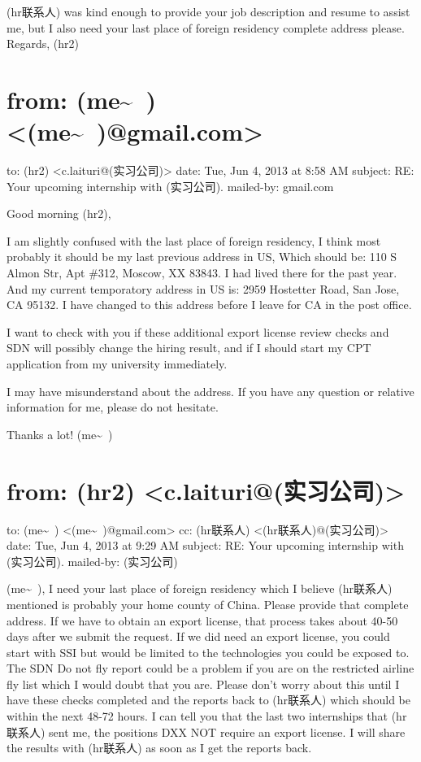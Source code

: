 \documentclass[12pt]{book}
\begin{document}
(hr联系人) was kind enough to provide your job description and resume to assist me, but I also need your last place of foreign residency complete address please.
Regards,
(hr2)


\section{from:         (me\textasciitilde{}~) <(me\textasciitilde{}~)@gmail.com>}
\label{sec-39-2}
to:         (hr2) <c.laituri@(实习公司)>
date:         Tue, Jun 4, 2013 at 8:58 AM
subject:         RE: Your upcoming internship with (实习公司).
mailed-by:         gmail.com

Good morning (hr2),

I am slightly confused with the last place of foreign residency, I think most probably it should be my last previous address in US, Which should be:  110 S Almon Str, Apt \#312, Moscow, XX 83843. I had lived there for the past year. And my current temporatory address in US is:  2959 Hostetter Road, San Jose, CA 95132. I have changed to this address before I leave for CA in the post office.

I want to check with you if these additional export license review checks and SDN will possibly change the hiring result, and if I should start my CPT application from my university immediately. 

I may have misunderstand about the address. If you have any question or relative information for me, please do not hesitate.

Thanks a lot!
(me\textasciitilde{}~)


\section{from:         (hr2) <c.laituri@(实习公司)>}
\label{sec-39-3}
to:         (me\textasciitilde{}~) <(me\textasciitilde{}~)@gmail.com>
cc:         (hr联系人) <(hr联系人)@(实习公司)>
date:         Tue, Jun 4, 2013 at 9:29 AM
subject:         RE: Your upcoming internship with (实习公司).
mailed-by:         (实习公司)

(me\textasciitilde{}~),
I need your last place of foreign residency which I believe (hr联系人) mentioned is probably your home county of China.  Please provide that complete address. If we have to obtain an export license, that process takes about 40-50 days after we submit the request. If we did need an export license, you could start with SSI but would be limited to the technologies you could be exposed to. The SDN Do not fly report could be a problem if you are on the restricted airline fly list which I would doubt that you are. Please don't worry about this until I have these checks completed and the reports back to (hr联系人) which should be within the next 48-72 hours. I can tell you that the last two internships that (hr联系人) sent me, the positions DXX NOT require an export license. I will share the results with (hr联系人) as soon as I get the reports back.
\end{document}
